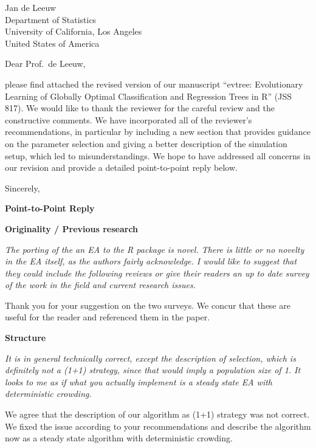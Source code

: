 \documentclass[DIN, pagenumber=false, parskip=half,%
               fromalign=left, fromphone=true,%
               fromemail=true, fromurl=false, %
               fromlogo=true, fromrule=false, fromrule=afteraddress]{scrlttr2}
\begin{document}
\begin{letter}{
  Jan de Leeuw\\
  Department of Statistics\\
  University of California, Los Angeles\\
  United States of America
}

\opening{Dear Prof.~de Leeuw,}

please find attached the revised version of our manuscript
``evtree: Evolutionary Learning of Globally Optimal Classification and Regression Trees in R''
(JSS 817). We would like to thank the reviewer for the careful review and the constructive
comments. We have incorporated all of the reviewer's recommendations,
in particular by including a new section that provides guidance on the parameter selection and
giving a better description of the simulation setup, which led to misunderstandings.
We hope to have addressed all concerns in our revision and provide a detailed
point-to-point reply below.

Sincerely,\\[-2cm]
\closing{}

\end{letter}


\newpage


\textbf{\large Point-to-Point Reply}

\bigskip

\textbf{Originality / Previous research}

\textit{The porting of the an EA to the R package is novel.  There is
little or no novelty in the EA itself, as the authors fairly acknowledge. 
I would like to suggest that they could include the following
reviews or give their readers an up to date survey of the work 
in the field and current research issues.}

Thank you for your suggestion on the two surveys. We concur that these are useful
for the reader and referenced them in the paper.

\bigskip

\textbf{Structure}

\textit{It is in general technically 
correct,  except the description of selection, which is definitely 
not a (1+1) strategy, since that would imply a population size of 1.
It looks to me as if what you actually implement is a steady state 
EA with  deterministic crowding.} 

We agree that the description of our algorithm as (1+1) strategy was not correct.
We fixed the issue according to your recommendations and describe the algorithm now
as a steady state algorithm with deterministic crowding.
\end{document}
